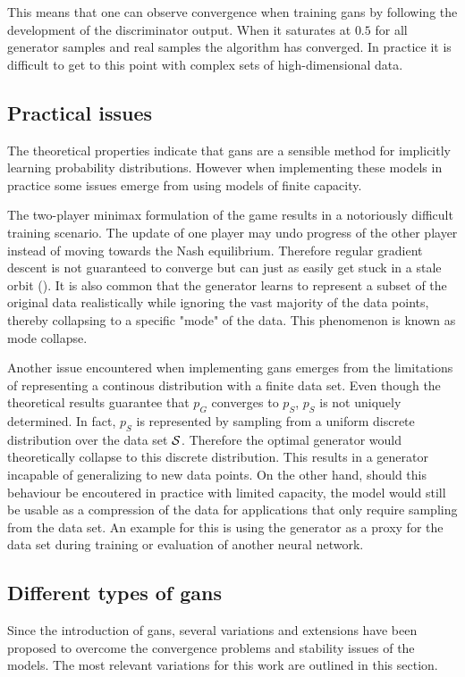 This means that one can observe convergence when training \acrshort{gans} by following the development of the discriminator output. When it saturates at $0.5$ for all generator samples and real samples the algorithm has converged. In practice it is difficult to get to this point with complex sets of high-dimensional data.

\subsection{Practical issues}
The theoretical properties indicate that \acrshort{gans} are a sensible method for implicitly learning probability distributions. However when implementing these models in practice some issues emerge from using models of finite capacity. 

The two-player minimax formulation of the game results in a notoriously difficult training scenario. The update of one player may undo progress of the other player instead of moving towards the Nash equilibrium. Therefore regular gradient descent is not guaranteed to converge but can just as easily get stuck in a stale orbit (\textcite{salimans2016improved}). It is also common that the generator learns to represent a subset of the original data realistically while ignoring the vast majority of the data points, thereby collapsing to a specific "mode" of the data. This phenomenon is known as mode collapse.

Another issue encountered when implementing \acrshort{gans} emerges from the limitations of representing a continous distribution with a finite data set. Even though the theoretical results guarantee that $p_G$ converges to $p_S$, $p_S$ is not uniquely determined. In fact, $p_S$ is represented by sampling from a uniform discrete distribution over the data set $\mathcal{S}$. Therefore the optimal generator would theoretically collapse to this discrete distribution. This results in a generator incapable of generalizing to new data points. On the other hand, should this behaviour be encoutered in practice with limited capacity, the model would still be usable as a compression of the data for applications that only require sampling from the data set. An example for this is using the generator as a proxy for the data set during training or evaluation of another neural network.
 
\subsection{Different types of \acrshort{gans}}
Since the introduction of \acrshort{gans}, several variations and extensions have been proposed to overcome the convergence problems and stability issues of the models. The most relevant variations for this work are outlined in this section.

